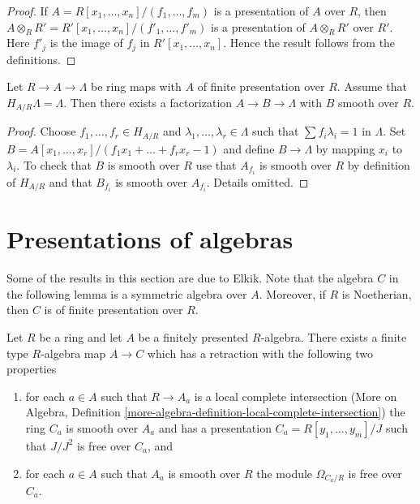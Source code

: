 \begin{proof}
If $A = R[x_1, \ldots, x_n]/(f_1, \ldots, f_m)$ is a presentation
of $A$ over $R$, then
$A \otimes_R R' = R'[x_1, \ldots, x_n]/(f'_1, \ldots, f'_m)$
is a presentation of $A \otimes_R R'$ over $R'$. Here $f'_j$ is
the image of $f_j$ in $R'[x_1, \ldots, x_n]$.
Hence the result follows from the definitions.
\end{proof}

\begin{lemma}
\label{lemma-final-solve}
Let $R \to A \to \Lambda$ be ring maps with $A$ of finite presentation
over $R$. Assume that $H_{A/R} \Lambda = \Lambda$. Then there exists
a factorization $A \to B \to \Lambda$ with $B$ smooth over $R$.
\end{lemma}

\begin{proof}
Choose $f_1, \ldots, f_r \in H_{A/R}$ and
$\lambda_1, \ldots, \lambda_r \in \Lambda$ such that
$\sum f_i\lambda_i = 1$ in $\Lambda$. Set
$B = A[x_1, \ldots, x_r]/(f_1x_1 + \ldots + f_rx_r - 1)$
and define $B \to \Lambda$ by mapping $x_i$ to $\lambda_i$.
To check that $B$ is smooth over $R$ use that $A_{f_i}$ is smooth
over $R$ by definition of $H_{A/R}$ and that $B_{f_i}$ is smooth
over $A_{f_i}$. Details omitted.
\end{proof}





\section{Presentations of algebras}
\label{section-presentations}

\noindent
Some of the results in this section are due to Elkik. Note that the algebra
$C$ in the following lemma is a symmetric algebra over $A$. Moreover, if
$R$ is Noetherian, then $C$ is of finite presentation over $R$.

\begin{lemma}
\label{lemma-improve-presentation}
Let $R$ be a ring and let $A$ be a finitely presented $R$-algebra.
There exists a finite type $R$-algebra map $A \to C$ which has a
retraction with the following two properties
\begin{enumerate}
\item for each $a \in A$ such that $R \to A_a$ is a local complete
intersection (More on Algebra, Definition
\ref{more-algebra-definition-local-complete-intersection})
the ring $C_a$ is smooth over $A_a$ and has a presentation
$C_a = R[y_1, \ldots, y_m]/J$ such that $J/J^2$ is free over $C_a$, and
\item for each $a \in A$ such that $A_a$ is smooth over $R$ the
module $\Omega_{C_a/R}$ is free over $C_a$.
\end{enumerate}
\end{lemma}

